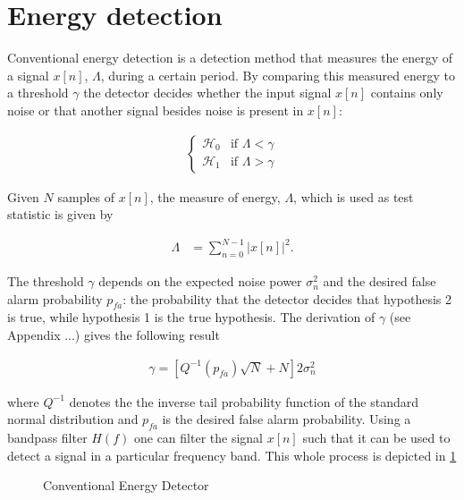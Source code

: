 \documentclass[a4paper, openany, oneside]{memoir}
\begin{document}
\section{Energy detection}
Conventional energy detection is a detection method that measures the energy of a signal $x[n]$, $\Lambda$, during a certain period. By comparing this measured energy to a threshold $\gamma$ the detector decides whether the input signal $x[n]$ contains only noise or that another signal besides noise is present in $x[n]$:

\begin{align*}
	\begin{cases}
		\mathcal{H}_0 & \text{if } \Lambda < \gamma \\
		\mathcal{H}_1 & \text{if } \Lambda > \gamma
	\end{cases}
\end{align*}
 
Given $N$ samples of $x[n]$, the measure of energy, $\Lambda$, which is used as test statistic is given by 

\begin{align}\label{eq:test_ed}
	\Lambda &= \sum_{n=0}^{N-1} |x[n]|^2.
\end{align}

The threshold $\gamma$ depends on the expected noise power $\sigma_n^2$ and the desired false alarm probability $p_{fa}$: the probability that the detector decides that hypothesis 2 is true, while hypothesis 1 is the true hypothesis. The derivation of $\gamma$ (see Appendix ...) gives the following result

\begin{align*}
\gamma = \left[Q^{-1}(p_{fa})\sqrt{N} + N\right]2\sigma_n^2
\end{align*}

where $Q^{-1}$ denotes the the inverse tail probability function of the standard normal distribution and $p_{fa}$ is the desired false alarm probability.
Using a bandpass filter $H(f)$ one can filter the signal $x[n]$ such that it can be used to detect a signal in a particular frequency band. This whole process is depicted
in \cref{tkz:conv_ed}
\begin{figure}[H]
\centering
{}
\caption{Conventional Energy Detector}\label{tkz:conv_ed}
\end{figure}
\end{document}
